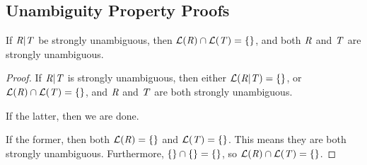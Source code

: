 \documentclass[numbers,10pt,preprint\ifanon ,nocopyrightspace\fi]{sigplanconf}
\begin{document}
\subsection{Unambiguity Property Proofs}
\begin{lemma}
  \label{lem:strong_unambig_or}
  If $\mathit{R} | \mathit{T}$ be strongly unambiguous, then
  $\mathcal{L}(\mathit{R}) \cap \mathcal{L}(\mathit{T}) = \{\}$,
  and both $\mathit{R}$ and $\mathit{T}$ are strongly unambiguous.
\end{lemma}
\begin{proof}
  If $\mathit{R} | \mathit{T}$ is strongly unambiguous, then either
  $\mathcal{L}(\mathit{R} | \mathit{T}) = \{\}$, or
  $\mathcal{L}(\mathit{R}) \cap \mathcal{L}(\mathit{T}) = \{\}$, and
  $\mathit{R}$ and $\mathit{T}$ are both strongly unambiguous.

  If the latter, then we are done.

  If the former, then both $\mathcal{L}(\mathit{R}) = \{\}$ and
  $\mathcal{L}(\mathit{T}) = \{\}$.
  This means they are both strongly unambiguous.  Furthermore,
  $\{\} \cap \{\} = \{\}$, so
  $\mathcal{L}(\mathit{R}) \cap \mathcal{L}(\mathit{T}) = \{\}$.
\end{proof}
\end{document}
